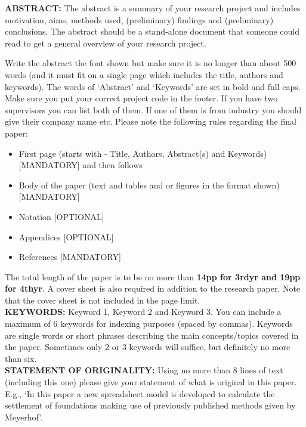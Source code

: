 \noindent 
\textbf{ABSTRACT: } The abstract is a summary of your research project and includes motivation, aims, methods used, (preliminary) findings and (preliminary) conclusions.  The abstract should be a stand-alone document that someone could read to get a general overview of your research project.  

Write the abstract the font shown but make sure it is no longer than about 500 words (and it must fit on a single page which includes the title, authors and keywords). The words of ‘Abstract’ and ‘Keywords’ are set in bold and full caps.  Make sure you put your correct project code in the footer. If you have two supervisors you can list both of them.  If one of them is from industry you should give their company name etc.
Please note the following rules regarding the final paper:
\begin{itemize}
    \item First page (starts with - Title, Authors, Abstract(s) and Keywords) [MANDATORY] and then follows
    \item Body of the paper (text and tables and or figures in the format shown) [MANDATORY]
    \item Notation [OPTIONAL]
    \item Appendices [OPTIONAL]
    \item References [MANDATORY]
\end{itemize}

The total length of the paper is to be no more than \textbf{14pp for 3rdyr and 19pp for 4thyr}. A cover sheet is also required in addition to the research paper. Note that the cover sheet is not included in the page limit.
\\

\noindent 
\textbf{KEYWORDS:} Keyword 1, Keyword 2 and Keyword 3. You can include a maximum of 6 keywords for indexing purposes (spaced by commas). Keywords are single words or short phrases describing the main concepts/topics covered in the paper. Sometimes only 2 or 3 keywords will suffice, but definitely no more than six.
\\

\noindent 
\textbf{STATEMENT OF ORIGINALITY:} Using no more than 8 lines of text (including this one) please give your statement of what is original in this paper. E.g., ‘In this paper a new spreadsheet model is developed to calculate the settlement of foundations making use of previously published methods given by Meyerhof’.